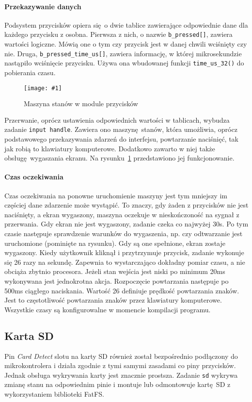 \documentclass[polish]{aghengthesis}
\newcommand{\imgint}[4]{
	\begin{figure}[{#4}]
		\centering
		\texttt{[image: \#1]}
		\caption{#2}
		\label{#1}
	\end{figure}
}
\newcommand{\imgh}[3]{\imgint{#1}{#2}{#3}{H}}
\begin{document}
			\paragraph{Przekazywanie danych}
				Podsystem przycisków opiera się o dwie tablice zawierające odpowiednie dane dla każdego przycisku z osobna. Pierwsza z nich, o nazwie \lstinline|b_pressed[]|, zawiera wartości logiczne. Mówią one o tym czy przycisk jest w danej chwili wciśnięty czy nie. Druga, \lstinline|b_pressed_time_us[]|, zawiera informację, w której mikrosekundzie nastąpiło wciśnięcie przycisku. Używa ona wbudowanej funkcji \lstinline|time_us_32()| do pobierania czasu.
			
			\imgh{3/PicoRadio-buttons}{Maszyna stanów w module przycisków}{0.75}
			
			Przerwanie, oprócz ustawienia odpowiednich wartości w tablicach, wybudza zadanie \lstinline|input handle|. Zawiera ono maszynę stanów, która umożliwia, oprócz podstawowego przekazywania zdarzeń do interfejsu, powtarzanie naciśnięć, tak jak robią to klawiatury komputerowe. Dodatkowo zawarto w niej także obsługę wygaszania ekranu. Na rysunku~\ref{3/PicoRadio-buttons} przedstawiono jej funkcjonowanie.
			
			\paragraph{Czas oczekiwania}
				Czas oczekiwania na ponowne uruchomienie maszyny jest tym mniejszy im częściej dane zdarzenie może wystąpić. To znaczy, gdy żaden z przycisków nie jest naciśnięty, a ekran wygaszony, maszyna oczekuje w nieskończoność na sygnał z przerwania. Gdy ekran nie jest wygaszony, zadanie czeka co najwyżej 30s. Po tym czasie następuje sprawdzenie warunków do wygaszenia, np. czy odtwarzanie jest uruchomione (pominięte na rysunku). Gdy są one spełnione, ekran zostaje wygaszony. Kiedy użytkownik kliknął i przytrzymuje przycisk, zadanie wykonuje się 26 razy na sekundę. Zapewnia to wystarczająco dokładny pomiar czasu, a nie obciąża zbytnio procesora. Jeżeli stan wejścia jest niski po minimum 20ms wykonywana jest jednokrotna akcja. Rozpoczęcie powtarzania następuje po 500ms ciągłego naciskania. Wartość 26 definiuje prędkość powtarzania znaków. Jest to częstotliwość powtarzania znaków przez klawiatury komputerowe. Wszystkie czasy są konfigurowalne w momencie kompilacji programu.
		
		\subsection{Karta SD}
			Pin \textit{Card Detect} slotu na karty SD również został bezpośrednio podłączony do mikrokontrolera i działa zgodnie z tymi samymi zasadami co piny przycisków. Jednak obsługa wykrywania karty jest znacznie prostsza. Zadanie \lstinline|sd| wykrywa zmianę stanu na odpowiednim pinie i montuje lub odmontowuje kartę SD z wykorzystaniem biblioteki FatFS.
			
\end{document}
